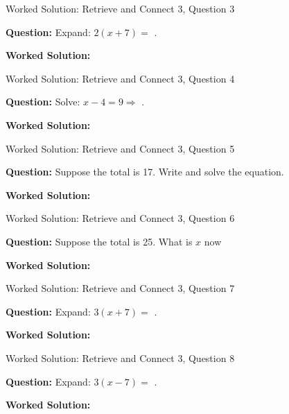 \documentclass{beamer}
\newcommand{\ablank}[1]{%
  \alt<2>{\textcolor{red}{#1}}{\underline{\phantom{#1}}}%
}
\newcommand{\ashow}[1]{\uncover<2->{\textcolor{red}{\small #1}}}
\newcommand{\ashowq}[1]{\alt<2->{\textcolor{red}{\small #1}}{?}}
\begin{document}
\begin{frame}{Worked Solution: Retrieve and Connect 3, Question 3}

\textbf{Question:} Expand: $2(x+7)=$\ablank{$2x+14$}.

\textbf{Worked Solution:} \ashow{Multiply each term by $2$: $2(x+7)=2x+14$.}

\end{frame}

\begin{frame}{Worked Solution: Retrieve and Connect 3, Question 4}

\textbf{Question:} Solve: $x-4=9 \Rightarrow$\ablank{$x=13$}.

\textbf{Worked Solution:} \ashow{Add $4$ to both sides: $x=9+4=13$.}

\end{frame}

\begin{frame}{Worked Solution: Retrieve and Connect 3, Question 5}

\textbf{Question:} Suppose the total is 17. Write and solve the equation.

\textbf{Worked Solution:} \ashow{The model has two $x$-blocks and a $5$-block, so $2x+5=17$. Subtract $5$: $2x=12$, so $x=6$.}

\end{frame}

\begin{frame}{Worked Solution: Retrieve and Connect 3, Question 6}

\textbf{Question:} Suppose the total is 25. What is $x$ now\ashowq{~$x=10$.}

\textbf{Worked Solution:} \ashow{Now $2x+5=25$. Subtract $5$: $2x=20$, so $x=10$.}

\end{frame}

\begin{frame}{Worked Solution: Retrieve and Connect 3, Question 7}

\textbf{Question:} Expand: $3(x+7)=$\ablank{$3x+21$}.

\textbf{Worked Solution:} \ashow{$3(x+7)=3x+21$.}

\end{frame}

\begin{frame}{Worked Solution: Retrieve and Connect 3, Question 8}

\textbf{Question:} Expand: $3(x-7)=$\ablank{$3x-21$}.

\textbf{Worked Solution:} \ashow{$3(x-7)=3x+3(-7)=3x-21$.}

\end{frame}
\end{document}
